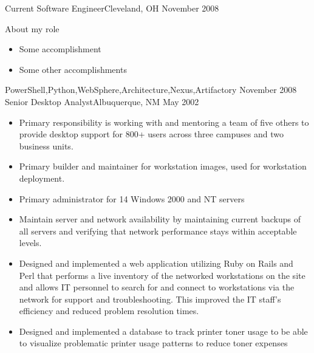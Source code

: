 %
%
%

\begin{experiences}
  \experience
    {Current}       {Software Engineer}{}{Cleveland, OH}
    {November 2008} {
                      About my role
                      \begin{itemize}
                        \item Some accomplishment
                        \item Some other accomplishments
                      \end{itemize}
                    }
                    {PowerShell,Python,WebSphere,Architecture,Nexus,Artifactory}
  \emptySeparator
  \experience
    {November 2008} {Senior Desktop Analyst}{}{Albuquerque, NM}
    {May 2002}    {
                      \begin{itemize}
                        \item
                          Primary responsibility is working with and mentoring a team of five others to provide desktop support for 800+ users across three campuses and two business units.
                        \item
                        Primary builder and maintainer for workstation images, used for workstation deployment.
                        \item Primary administrator for 14 Windows 2000 and NT servers
                        \item Maintain server and network availability by maintaining current backups of all servers and verifying that network performance stays within acceptable levels.
                        \item Designed and implemented a web application utilizing Ruby on Rails and Perl that performs a live inventory of the networked workstations on the site and allows IT personnel to search for and connect to workstations via the network for support and troubleshooting. This improved the IT staff’s efficiency and reduced problem resolution times.
                        \item Designed and implemented a database to track printer toner usage to be able to visualize problematic printer usage patterns to reduce toner expenses

\end{itemize}}
\end{experiences}
